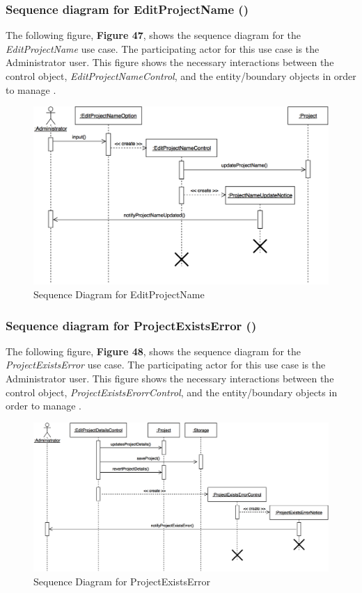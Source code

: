 \documentclass[12pt,letterpaper]{article}
\begin{document}
\subsubsection*{Sequence diagram for EditProjectName (\editprojectname{})}

The following figure, {\bf Figure 47}, shows the sequence diagram for the {\it EditProjectName} use case. The participating actor for this use case is
the Administrator user. This figure shows the necessary interactions between the control object, {\it EditProjectNameControl}, and the
entity/boundary objects in order to manage \editprojectname{}.

\begin{figure}[H]
	\centering{}
	\includegraphics[scale=0.3]{imgs/seq/edit-project-name.png}
	\caption{Sequence Diagram for EditProjectName}
\end{figure}

\subsubsection*{Sequence diagram for ProjectExistsError (\projectexistserror{})}

The following figure, {\bf Figure 48}, shows the sequence diagram for the {\it ProjectExistsError} use case. The participating actor for this use case is
the Administrator user. This figure shows the necessary interactions between the control object, {\it ProjectExistsErorrControl}, and the
entity/boundary objects in order to manage \projectexistserror{}.

\begin{figure}[H]
	\centering{}
	\includegraphics[scale=0.3]{imgs/seq/project-exists-error.png}
	\caption{Sequence Diagram for ProjectExistsError}
\end{figure}
\end{document}
